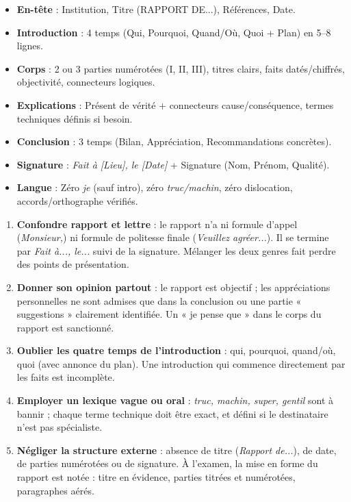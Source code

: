 \documentclass[11pt]{article}
\begin{document}
\begin{aretenir}
\begin{itemize}
\item [ ] \textbf{En-tête} : Institution, Titre (RAPPORT DE...), Références, Date.
\item [ ] \textbf{Introduction} : 4 temps (Qui, Pourquoi, Quand/Où, Quoi + Plan) en 5--8 lignes.
\item [ ] \textbf{Corps} : 2 ou 3 parties numérotées (I, II, III), titres clairs, faits datés/chiffrés, objectivité, connecteurs logiques.
\item [ ] \textbf{Explications} : Présent de vérité + connecteurs cause/conséquence, termes techniques définis si besoin.
\item [ ] \textbf{Conclusion} : 3 temps (Bilan, Appréciation, Recommandations concrètes).
\item [ ] \textbf{Signature} : \emph{Fait à [Lieu], le [Date]} + Signature (Nom, Prénom, Qualité).
\item [ ] \textbf{Langue} : Zéro \emph{je} (sauf intro), zéro \emph{truc/machin}, zéro dislocation, accords/orthographe vérifiés.
\end{itemize}
\end{aretenir}

\begin{attention}
\begin{enumerate}
\item \textbf{Confondre rapport et lettre} : le rapport n'a ni formule d'appel (\emph{Monsieur,}) ni formule de politesse finale (\emph{Veuillez agréer...}). Il se termine par \emph{Fait à..., le...} suivi de la signature. Mélanger les deux genres fait perdre des points de présentation.
\item \textbf{Donner son opinion partout} : le rapport est objectif ; les appréciations personnelles ne sont admises que dans la conclusion ou une partie « suggestions » clairement identifiée. Un « je pense que » dans le corps du rapport est sanctionné.
\item \textbf{Oublier les quatre temps de l'introduction} : qui, pourquoi, quand/où, quoi (avec annonce du plan). Une introduction qui commence directement par les faits est incomplète.
\item \textbf{Employer un lexique vague ou oral} : \emph{truc, machin, super, gentil} sont à bannir ; chaque terme technique doit être exact, et défini si le destinataire n'est pas spécialiste.
\item \textbf{Négliger la structure externe} : absence de titre (\emph{Rapport de...}), de date, de parties numérotées ou de signature. À l'examen, la mise en forme du rapport est notée : titre en évidence, parties titrées et numérotées, paragraphes aérés.
\end{enumerate}
\end{attention}
\end{document}
